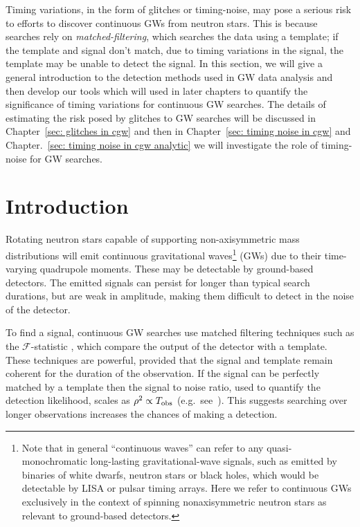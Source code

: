 \documentclass[../full_thesis/full_thesis.tex]{subfiles}
\begin{document}
Timing variations, in the form of glitches or timing-noise, may pose a serious
risk to efforts to discover continuous GWs from neutron stars. This is because
searches rely on \emph{matched-filtering}, which searches the data using a
template; if the template and signal don't match, due to timing variations in
the signal, the template may be unable to detect the signal. In this section,
we will give a general introduction to the detection methods used in GW data
analysis and then develop our tools which will used in later chapters to
quantify the significance of timing variations for continuous GW searches. The
details of estimating the risk posed by glitches to GW searches will be
discussed in Chapter~\ref{sec: glitches in cgw} and then in Chapter~\ref{sec:
timing noise in cgw} and Chapter.~\ref{sec: timing noise in cgw analytic} we
will investigate the role of timing-noise for GW searches.

\section{Introduction}
\label{sec: introduction cgw}
Rotating neutron stars capable of supporting non-axisymmetric mass
distributions will emit continuous gravitational
waves\footnote{Note that in general ``continuous waves'' can
    refer to any quasi-monochromatic long-lasting gravitational-wave
        signals, such as emitted by binaries of white dwarfs, neutron
        stars or black holes, which would be detectable by LISA or pulsar
        timing arrays. Here we refer to continuous GWs exclusively in the context of
        spinning nonaxisymmetric neutron stars as relevant to ground-based
        detectors.}
(GWs) due to their
time-varying quadrupole moments. These may be detectable by ground-based detectors. The emitted
signals can persist for longer than
typical search durations, but are weak in amplitude, making them difficult to detect
in the noise of the detector.

To find a signal, continuous GW searches use matched
filtering techniques such as the $\mathcal{F}$-statistic \citep{Jaranowski1998},
which compare the output of the detector with a template.  These techniques are
powerful, provided that the signal and template remain coherent for the duration
of the observation. If the signal can be perfectly matched by a template then
the signal to noise ratio, used to quantify the detection likelihood, scales as
$\rho^{2} \propto T_{\textrm{obs}}$ (e.g.\ see~\citep{Prix2009}). This suggests searching
over longer observations increases the chances of making a detection.
\end{document}
